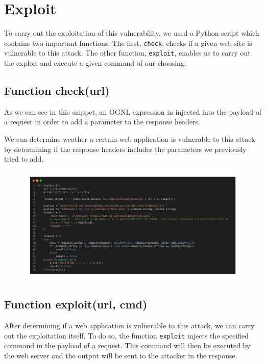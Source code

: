 \documentclass[a4paper, 11pt]{article}
\begin{document}
\section{Exploit}

To carry out the exploitation of this vulnerability, we used a Python script which contains two important
functions. The first, \texttt{check}, checks if a given web site is vulnerable to this attack. The other
function, \texttt{exploit}, enables us to carry out the exploit and execute a given command of our choosing.

\subsection{Function check(url)}

As we can see in this snippet, an OGNL expression in injected into the payload of a request in order
to add a parameter to the response headers.

We can determine weather a certain web application is vulnerable to this attack by determining if the
response headers includes the parameters we previously tried to add.

\vspace{2cm}

\begin{figure}[H]
    \centering
    \includegraphics[width=\textwidth]{img/check.png}
\end{figure}

\pagebreak

\subsection{Function exploit(url, cmd)}

After determining if a web application is vulnerable to this attack, we can carry out the exploitation
itself. To do so, the function \texttt{exploit} injects the specified command in the payload of a request.
This command will then be executed by the web server and the output will be sent to the attacker in the
response.
\end{document}
